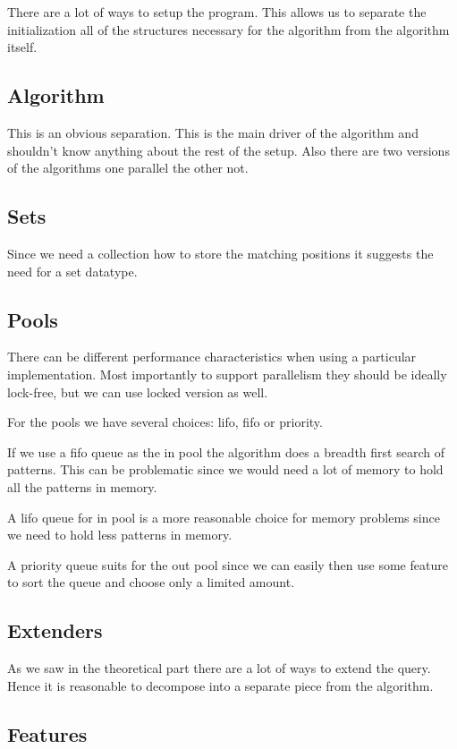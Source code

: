There are a lot of ways to setup the program. This allows us to separate
the initialization all of the structures necessary for the algorithm
from the algorithm itself.

\subsection{Algorithm}

This is an obvious separation. This is the main driver of the algorithm
and shouldn't know anything about the rest of the setup. Also there
are two versions of the algorithms one parallel the other not.

\subsection{Sets}

Since we need a collection how to store the matching positions it suggests
the need for a set datatype.

\subsection{Pools}

There can be different performance characteristics when using a particular
implementation. Most importantly to support parallelism they should
be ideally lock-free, but we can use locked version as well.

For the pools we have several choices: lifo, fifo or priority.

If we use a fifo queue as the in pool the algorithm does a breadth first
search of patterns. This can be problematic since we would need a lot of
memory to hold all the patterns in memory.

A lifo queue for in pool is a more reasonable choice for memory problems since we need
to hold less patterns in memory.

A priority queue suits for the out pool since we can easily then
use some feature to sort the queue and choose only a limited amount.

\subsection{Extenders}

As we saw in the theoretical part there are a lot of ways to extend
the query. Hence it is reasonable to decompose into a separate piece from
the algorithm.

\subsection{Features}

